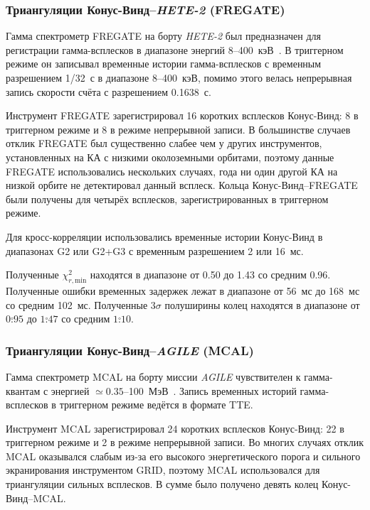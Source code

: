 \subsubsection{Триангуляции Конус-Винд--\textit{HETE-2} (FREGATE)}
Гамма спектрометр FREGATE на борту \textit{HETE-2} был предназначен для регистрации 
гамма-всплесков в диапазоне энергий 8--400~кэВ~\citep{Ricker_2003AIPC, Atteia_2003AIPC}. 
В триггерном режиме он записывал временные истории гамма-всплесков с временным 
разрешением 1/32~с в диапазоне 8--400~кэВ, помимо этого велась непрерывная запись 
скорости счёта с разрешением 0.1638~с.

Инструмент FREGATE зарегистрировал 16 коротких всплесков Конус-Винд: 8 в триггерном режиме 
и 8 в режиме непрерывной записи. В большинстве случаев отклик FREGATE был существенно
слабее чем у других инструментов, установленных на КА с низкими околоземными орбитами, 
поэтому данные FREGATE использовались нескольких случаях, года ни один другой КА на низкой 
орбите не детектировал данный всплеск. Кольца Конус-Винд--FREGATE были получены для четырёх 
всплесков, зарегистрированных в триггерном режиме.

Для кросс-корреляции использовались временные истории Конус-Винд в диапазонах G2 
или G2+G3 с временным разрешением 2 или 16~мс.

Полученные $\chi^2_{r,\textrm{min}}$ находятся в диапазоне от 0.50 до 1.43 со средним 0.96. 
Полученные ошибки временных задержек лежат в диапазоне от 56~мс до 168~мс со средним 102~мс. 
Полученные $3\sigma$ полуширины колец находятся в диапазоне от $0\overset{\circ}{.}95$ 
до $1\overset{\circ}{.}47$ со средним $1\overset{\circ}{.}10$.

\subsubsection{Триангуляции Конус-Винд--\textit{AGILE} (MCAL)}
Гамма спектрометр MCAL на борту миссии \textit{AGILE} чувствителен к гамма-квантам 
с энергией $\simeq 0.35$--100~МэВ~\citep{Tavani_2009AA}. Запись временных историй 
гамма-всплесков в триггерном режиме ведётся в формате TTE.

Инструмент MCAL зарегистрировал 24 коротких всплесков Конус-Винд: 22 в триггерном 
режиме и 2 в режиме непрерывной записи. Во многих случаях отклик MCAL оказывался 
слабым из-за его высокого энергетического порога и сильного экранирования инструментом GRID, 
поэтому MCAL использовался для триангуляции сильных всплесков. В сумме было получено девять колец
Конус-Винд--MCAL.

